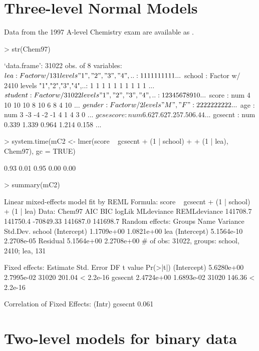 \documentclass[12pt]{article}
\begin{document}
\section{Three-level Normal Models}
\label{sec:three-level}
Data from the 1997 A-level Chemistry exam are available as .
\begin{Schunk}
\begin{Sinput}
> str(Chem97)
\end{Sinput}
\begin{Soutput}
`data.frame':	31022 obs. of  8 variables:
 $ lea      : Factor w/ 131 levels "1","2","3","4",..: 1 1 1 1 1 1 1 1 1 1 ...
 $ school   : Factor w/ 2410 levels "1","2","3","4",..: 1 1 1 1 1 1 1 1 1 1 ...
 $ student  : Factor w/ 31022 levels "1","2","3","4",..: 1 2 3 4 5 6 7 8 9 10 ...
 $ score    : num  4 10 10 10 8 10 6 8 4 10 ...
 $ gender   : Factor w/ 2 levels "M","F": 2 2 2 2 2 2 2 2 2 2 ...
 $ age      : num  3 -3 -4 -2 -1 4 1 4 3 0 ...
 $ gcsescore: num  6.62 7.62 7.25 7.50 6.44 ...
 $ gcsecnt  : num  0.339 1.339 0.964 1.214 0.158 ...
\end{Soutput}
\begin{Sinput}
> system.time(mC2 <- lmer(score ~ gcsecnt + (1 | school) + 
+     (1 | lea), Chem97), gc = TRUE)
\end{Sinput}
\begin{Soutput}
[1] 0.93 0.01 0.95 0.00 0.00
\end{Soutput}
\begin{Sinput}
> summary(mC2)
\end{Sinput}
\begin{Soutput}
Linear mixed-effects model fit by REML
Formula: score ~ gcsecnt + (1 | school) + (1 | lea) 
   Data: Chem97 
      AIC      BIC    logLik MLdeviance REMLdeviance
 141708.7 141750.4 -70849.33   141687.0     141698.7
Random effects:
 Groups   Name        Variance   Std.Dev.  
 school   (Intercept) 1.1709e+00 1.0821e+00
 lea      (Intercept) 5.1564e-10 2.2708e-05
 Residual             5.1564e+00 2.2708e+00
# of obs: 31022, groups: school, 2410; lea, 131

Fixed effects:
              Estimate Std. Error    DF t value  Pr(>|t|)
(Intercept) 5.6280e+00 2.7995e-02 31020  201.04 < 2.2e-16
gcsecnt     2.4724e+00 1.6893e-02 31020  146.36 < 2.2e-16

Correlation of Fixed Effects:
        (Intr)
gcsecnt 0.061 
\end{Soutput}
\end{Schunk}


\section{Two-level models for binary data}
\label{sec:TwolevelBinary}
\end{document}
